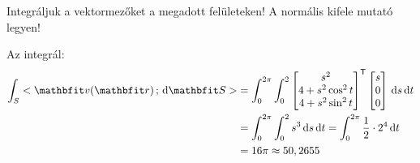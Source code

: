 \documentclass[exercise]{math-standalone}
\begin{document}
\begin{exercise}{%
    Integráljuk a vektormezőket a megadott felületeken!
    A normális kifele mutató legyen!
  }
{\begin{enumerate}[a)]
            Az integrál:
            \begin{align*}
              \int_S \scalar{\rvec v(\coordv)}{\diff \rvec S}
               & =
              \int_0^{2\pi}\int_0^2
              \begin{bmatrix}
                s^2              \\
                4 + s^2 \cos^2 t \\
                4 + s^2 \sin^2 t
              \end{bmatrix}^\transpose
              \begin{bmatrix}
                s \\ 0 \\ 0
              \end{bmatrix}
              \,\diff s \,\diff t
              \\
               & =
              \int_0^{2\pi}\int_0^2
              s^3
              \,\diff s \,\diff t
              =
              \int_0^{2\pi}
              \frac12 \cdot 2^4
              \,\diff t
              \\
               & =
              16 \pi
              \approx
              50,2655
            \end{align*}
    \end{enumerate}
  }
\end{exercise}
\end{document}
